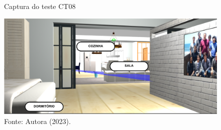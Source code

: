 \begin{figure}[H]
    \centering
    \caption{Captura do teste CT08}
    \includegraphics[scale=0.5]{ct08.png}
    \caption*{Fonte: Autora (2023).}
    \label{fig:ct08}
\end{figure}